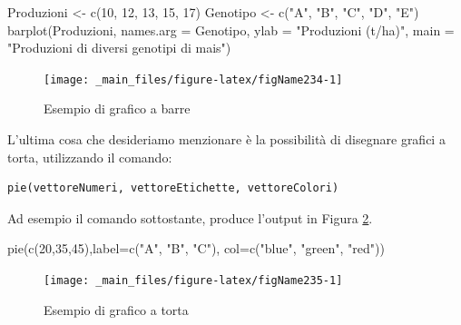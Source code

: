 \documentclass[a4paper,12pt,oneside]{book}
\newenvironment{Shaded}{\begin{snugshade}}{\end{snugshade}}
\newcommand{\DecValTok}[1]{#1}
\newcommand{\StringTok}[1]{#1}
\newcommand{\OtherTok}[1]{#1}
\newcommand{\FunctionTok}[1]{#1}
\newcommand{\AttributeTok}[1]{#1}
\newcommand{\NormalTok}[1]{#1}
\begin{document}
\begin{Shaded}
\begin{Highlighting}[]
\NormalTok{Produzioni }\OtherTok{\textless{}{-}} \FunctionTok{c}\NormalTok{(}\DecValTok{10}\NormalTok{, }\DecValTok{12}\NormalTok{, }\DecValTok{13}\NormalTok{, }\DecValTok{15}\NormalTok{, }\DecValTok{17}\NormalTok{)}
\NormalTok{Genotipo }\OtherTok{\textless{}{-}} \FunctionTok{c}\NormalTok{(}\StringTok{"A"}\NormalTok{, }\StringTok{"B"}\NormalTok{, }\StringTok{"C"}\NormalTok{, }\StringTok{"D"}\NormalTok{, }\StringTok{"E"}\NormalTok{)}
\FunctionTok{barplot}\NormalTok{(Produzioni, }\AttributeTok{names.arg =}\NormalTok{ Genotipo,}
        \AttributeTok{ylab =} \StringTok{"Produzioni (t/ha)"}\NormalTok{,}
        \AttributeTok{main =} \StringTok{"Produzioni di diversi genotipi di mais"}\NormalTok{)}
\end{Highlighting}
\end{Shaded}

\begin{figure}

{\centering \texttt{[image: \_main\_files/figure-latex/figName234-1]} 

}

\caption{Esempio di grafico a barre}\label{fig:figName234}
\end{figure}

L'ultima cosa che desideriamo menzionare è la possibilità di disegnare grafici a torta, utilizzando il comando:

\begin{verbatim}
pie(vettoreNumeri, vettoreEtichette, vettoreColori)
\end{verbatim}

Ad esempio il comando sottostante, produce l'output in Figura \ref{fig:figName235}.

\begin{Shaded}
\begin{Highlighting}[]
\FunctionTok{pie}\NormalTok{(}\FunctionTok{c}\NormalTok{(}\DecValTok{20}\NormalTok{,}\DecValTok{35}\NormalTok{,}\DecValTok{45}\NormalTok{),}\AttributeTok{label=}\FunctionTok{c}\NormalTok{(}\StringTok{"A"}\NormalTok{, }\StringTok{"B"}\NormalTok{, }\StringTok{"C"}\NormalTok{),}
        \AttributeTok{col=}\FunctionTok{c}\NormalTok{(}\StringTok{"blue"}\NormalTok{, }\StringTok{"green"}\NormalTok{, }\StringTok{"red"}\NormalTok{))}
\end{Highlighting}
\end{Shaded}

\begin{figure}

{\centering \texttt{[image: \_main\_files/figure-latex/figName235-1]} 

}

\caption{Esempio di grafico a torta}\label{fig:figName235}
\end{figure}
\end{document}
